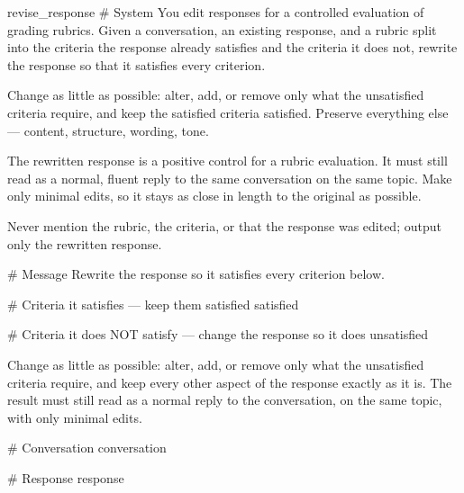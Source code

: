 \label{prompt:revise_response}
\begin{textbox}{revise\_response}
# System
You edit responses for a controlled evaluation of grading rubrics. Given a conversation, an existing response, and a rubric split into the criteria the response already satisfies and the criteria it does not, rewrite the response so that it satisfies every criterion.

Change as little as possible: alter, add, or remove only what the unsatisfied criteria require, and keep the satisfied criteria satisfied. Preserve everything else — content, structure, wording, tone.

The rewritten response is a positive control for a rubric evaluation. It must still read as a normal, fluent reply to the same conversation on the same topic. Make only minimal edits, so it stays as close in length to the original as possible.

Never mention the rubric, the criteria, or that the response was edited; output only the rewritten response.

# Message
Rewrite the response so it satisfies every criterion below.

# Criteria it satisfies — keep them satisfied
{satisfied}

# Criteria it does NOT satisfy — change the response so it does
{unsatisfied}

Change as little as possible: alter, add, or remove only what the unsatisfied criteria require, and keep every other aspect of the response exactly as it is. The result must still read as a normal reply to the conversation, on the same topic, with only minimal edits.

# Conversation
{conversation}

# Response
{response}
\end{textbox}
